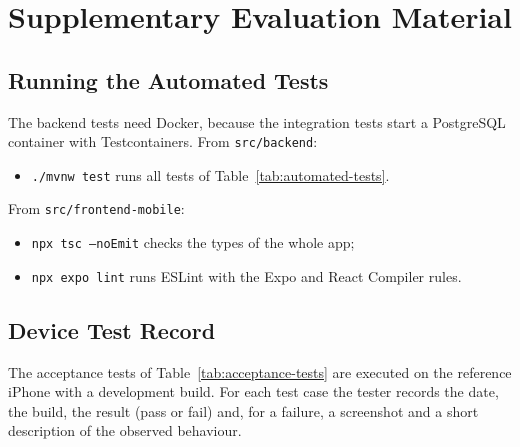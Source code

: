 \chapter{Supplementary Evaluation Material}
\label{app:evaluation-material}

\section{Running the Automated Tests}

The backend tests need Docker, because the integration tests start a
PostgreSQL container with Testcontainers. From \texttt{src/backend}:
\begin{itemize}[leftmargin=1.8em,itemsep=2pt]
  \item \texttt{./mvnw test} runs all tests of Table~\ref{tab:automated-tests}.
\end{itemize}
From \texttt{src/frontend-mobile}:
\begin{itemize}[leftmargin=1.8em,itemsep=2pt]
  \item \texttt{npx tsc --noEmit} checks the types of the whole app;
  \item \texttt{npx expo lint} runs ESLint with the Expo and React Compiler rules.
\end{itemize}

\section{Device Test Record}

The acceptance tests of Table~\ref{tab:acceptance-tests} are executed on the
reference iPhone with a development build. For each test case the tester
records the date, the build, the result (pass or fail) and, for a failure, a
screenshot and a short description of the observed behaviour.
